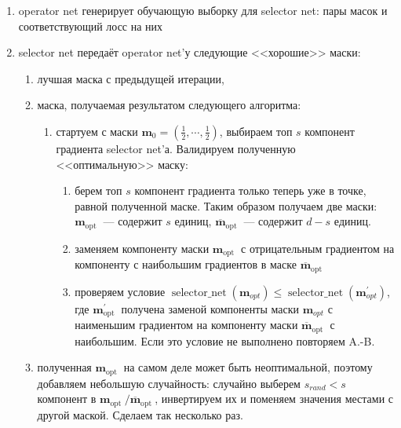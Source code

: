 \documentclass[12pt]{article}
\begin{document}
\begin{enumerate}[noitemsep]
    \item operator net генерирует обучающую выборку для selector net: пары масок и соответствующий лосс на них
    \item selector net передаёт operator net'у следующие <<хорошие>> маски:
    \begin{enumerate}
        \item лучшая маска с предыдущей итерации,
        \item маска, получаемая результатом следующего алгоритма:
        \begin{enumerate}
            \item стартуем с маски $\boldsymbol{m}_{0}=\left(\frac{1}{2}, \cdots, \frac{1}{2}\right)$, выбираем топ $s$ компонент градиента selector net'а. Валидируем полученную <<оптимальную>> маску:
            \begin{enumerate}
                \item берем топ $s$ компонент градиента только теперь уже в точке, равной полученной маске. Таким образом получаем две маски: $\boldsymbol{m}_{\text {opt }}$ --- содержит $s$ единиц, $\overline{\boldsymbol{m}}_{\text {opt }}$ --- содержит $d-s$ единиц.
                \item заменяем компоненту маски $\boldsymbol{m}_{\text {opt }}$ с отрицательным градиентом на компоненту с наибольшим градиентов в маске $\overline{\boldsymbol{m}}_{\text {opt }}$
                \item проверяем условие $\operatorname{selector\_net}\left(\boldsymbol{m}_{o p t}\right) \leq \operatorname{selector\_net}\left(\boldsymbol{m}_{o p t}^{\prime}\right)$, где $\boldsymbol{m}_{\text {opt }}^{\prime}$ получена заменой компоненты маски $\boldsymbol{m}_{o p t}$ с наименьшим градиентом на компоненту маски $\overline{\boldsymbol{m}}_{\text {opt }}$ с наибольшим. Если это условие не выполнено повторяем A.-B.
            \end{enumerate}
        \end{enumerate}
        \item полученная $\boldsymbol{m}_{\text {opt }}$ на самом деле может быть неоптимальной, поэтому добавляем небольшую случайность: случайно выберем $s_{rand} < s$ компонент в $\boldsymbol{m}_{\text {opt }}/\overline{\boldsymbol{m}}_{\text {opt }}$, инвертируем их и поменяем значения местами с другой маской. Сделаем так несколько раз. 
    \end{enumerate}
\end{enumerate}
\end{document}
